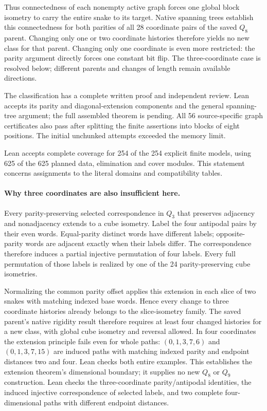 \documentclass[11pt,a4paper]{article}
\begin{document}
Thus connectedness of each nonempty active graph forces one
global block isometry to carry the entire snake to its target.
Native spanning trees establish this connectedness for both
parities of all 28 coordinate pairs of the saved $Q_8$ parent.
Changing only one or two coordinate histories therefore yields
no new class for that parent. Changing only one coordinate is
even more restricted: the parity argument directly forces one
constant bit flip. The three-coordinate case is resolved below;
different parents and changes of length remain available directions.

The classification has a complete written proof and independent
review. Lean accepts its parity and diagonal-extension components
and the general spanning-tree argument; the full assembled
theorem is pending. All 56 source-specific graph certificates also pass after splitting
the finite assertions into blocks of eight positions. The initial
unchunked attempts exceeded the memory limit.

Lean accepts complete coverage for 254 of the 254 explicit finite models, using 625 of the 625 planned data, elimination and cover modules. This statement concerns assignments to the literal domains and compatibility tables.

\paragraph{Why three coordinates are also insufficient here.}
Every parity-preserving selected correspondence in $Q_3$ that
preserves adjacency and nonadjacency extends to a cube isometry. Label the four
antipodal pairs by their even words. Equal-parity distinct words
have different labels; opposite-parity words are adjacent exactly
when their labels differ. The correspondence therefore induces a
partial injective permutation of four labels. Every full permutation
of those labels is realized by one of the 24 parity-preserving
cube isometries.

Normalizing the common parity offset applies this extension in
each slice of two snakes with matching indexed base words. Hence
every change to three coordinate histories already belongs to the
slice-isometry family. The saved parent's native rigidity result
therefore requires at least four changed histories for a new class,
with global cube isometry and reversal allowed. In four coordinates
the extension principle fails even for whole paths: $(0,1,3,7,6)$
and $(0,1,3,7,15)$ are induced paths with matching indexed parity
and endpoint distances two and four. Lean checks both entire
examples. This establishes the extension theorem's dimensional
boundary; it supplies no new $Q_8$ or $Q_9$ construction. Lean checks the three-coordinate parity/antipodal identities, the induced injective correspondence of selected labels, and two complete four-dimensional paths with different endpoint distances.
\end{document}
